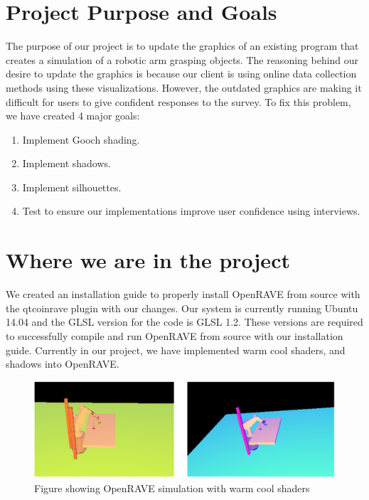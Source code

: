 \documentclass[10pt,journal,compsoc,draftclsnofoot]{IEEEtran}
\begin{document}
\begin{flushleft}

\section{Project Purpose and Goals}
The purpose of our project is to update the graphics of an existing program that creates a simulation of a robotic arm grasping objects.
The reasoning behind our desire to update the graphics is because our client is using online data collection methods using these visualizations.
However, the outdated graphics are making it difficult for users to give confident responses to the survey.
To fix this problem, we have created 4 major goals:
\begin{enumerate}
\item Implement Gooch shading.
\item Implement shadows.
\item Implement silhouettes.
\item Test to ensure our implementations improve user confidence using interviews.
\end{enumerate}

\section{Where we are in the project}
We created an installation guide to properly install OpenRAVE from source with the qtcoinrave plugin with our changes.
Our system is currently running Ubuntu 14.04 and the GLSL version for the code is GLSL 1.2.
These versions are required to successfully compile and run OpenRAVE from source with our installation guide.
Currently in our project, we have implemented warm cool shaders, and shadows into OpenRAVE.

\begin{figure} [H]
  \includegraphics[scale=0.8]{Warmcool.eps}
  \caption
{ \newline \hspace{\linewidth}
Figure showing OpenRAVE simulation with warm cool shaders}
  \label{fig:Warmcool}
\end{figure}


\end{flushleft}
\end{document}
